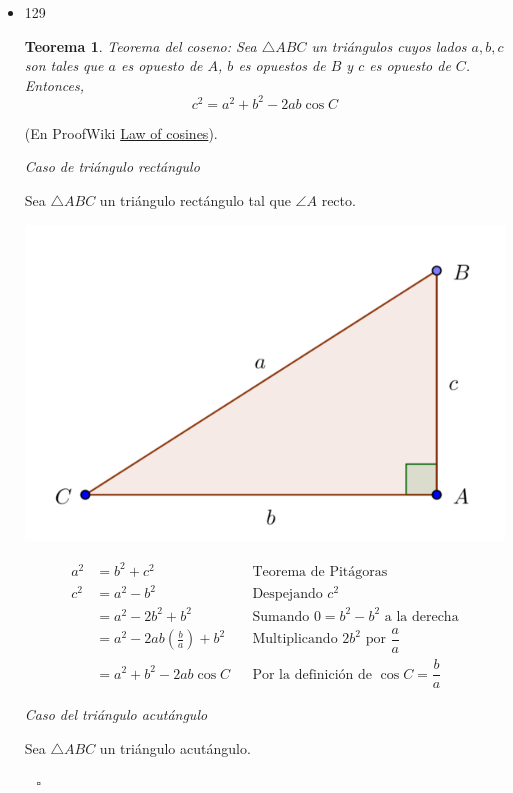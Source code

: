 \documentclass[a4paper,12pt,twoside]{book}
\theoremstyle{teorema}
\newtheorem{teorema}{Teorema}[section]
\theoremstyle{remark}
\newenvironment{demostracion}
{\noindent {\bf Demostración:}}
{\newline\mbox{ } \hfill $\square$}
\begin{document}
\begin{itemize}
\item 129
\begin{teorema}
Teorema del coseno: Sea \(\triangle ABC\) un triángulos cuyos lados
\(a, b, c\) son tales que \(a\) es opuesto de \(A\), \(b\) es opuestos de \(B\)
y \(c\) es opuesto de \(C\). Entonces,
$$c^2 = a^2 + b^2 - 2 a b \cos C$$
\end{teorema}
\begin{demostracion}
(En ProofWiki \href{https://proofwiki.org/wiki/Law\_of\_Cosines}{Law of cosines}).

\emph{Caso de triángulo rectángulo}

Sea \(\triangle ABC\) un triángulo rectángulo tal que \(\angle A\) recto.

\begin{center}
\includegraphics[width=.9\linewidth]{./fig/teorema-coseno-1.png}
\end{center}

\begin{align*}
a^2 &= b^2 + c^2
    && \text{Teorema de Pitágoras} \\
c^2 &= a^2 - b^2
    && \text{Despejando $c^{2}$}\\
    &= a^2 - 2 b^2 + b^2
    && \text{Sumando $0 = b^2 - b^2$ a la derecha} \\
    &= a^2 - 2 a b \left({\frac b a}\right) + b^2
    && \text{Multiplicando $2 b^2$ por $\dfrac a a$} \\
    &= a^2 + b^2 - 2 a b \cos C
    && \text{Por la definición de $\cos C = \dfrac b a$}
\end{align*}


\emph{Caso del triángulo acutángulo}

Sea \(\triangle ABC\) un triángulo acutángulo.


\end{demostracion}
\end{itemize}
\end{document}
